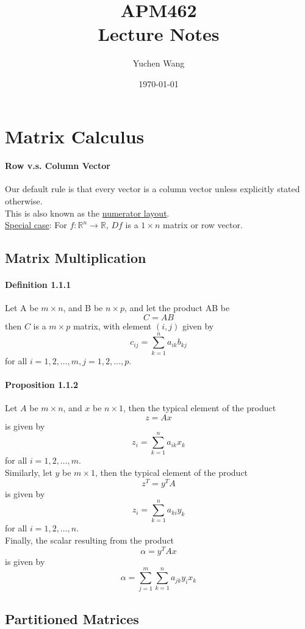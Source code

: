\documentclass[11pt]{article}
\title{APM462 \\ Lecture Notes}
\author{Yuchen Wang}
\date{\today}
\newcommand{\real}[0]{\mathbb{R}}
\newcommand{\under}[1]{\underline{#1}}
\begin{document}
    \maketitle
    \tableofcontents
    \newpage
    
\section{Matrix Calculus}
\paragraph{Row v.s. Column Vector}
Our default rule is that every vector is a column vector unless explicitly stated otherwise. \\
This is also known as the \under{numerator layout}. \\
\under{Special case}: For $f: \real^n \rightarrow \real$, $Df$ is a $ 1 \times n$ matrix or row vector.

\subsection{Matrix Multiplication}
\paragraph{Definition 1.1.1}
Let A be $m \times n$, and B be $n \times p$, and let the product AB be
$$C = AB$$
then $C$ is a $m \times p$ matrix, with element $(i,j)$ given by
$$c_{ij} = \sum_{k=1}^n a_{ik}b_{kj}$$
for all $i = 1, 2, \hdots, m, j = 1,2,\hdots,p$.
\paragraph{Proposition 1.1.2}
Let $A$ be $m \times n$, and $x$ be $n \times 1$, then the typical element of the product
$$ z = Ax$$
is given by
$$z_i = \sum_{k=1}^n a_{ik}x_k$$
for all $i= 1,2,\hdots,m$.\\
Similarly, let $y$ be $m \times 1$, then the typical element of the product
$$z^T = y^TA$$
is given by
$$ z_i = \sum_{k=1}^n a_{ki}y_k$$
for all $i = 1, 2,\hdots, n$.  \\
Finally, the scalar resulting from the product
$$\alpha = y^T A x$$
is given by
$$\alpha = \sum_{j=1}^m\sum_{k=1}^n a_{jk}y_i x_k$$

\subsection{Partitioned Matrices}
\end{document}
